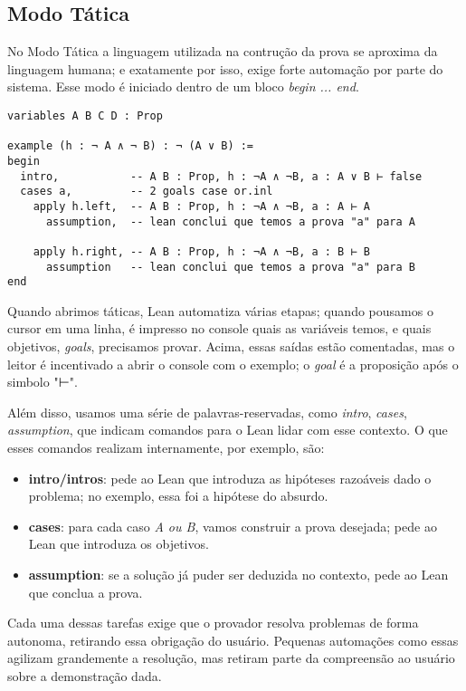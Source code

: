 \subsection{Modo Tática}
No Modo Tática a linguagem utilizada na contrução da prova se aproxima da linguagem humana; e exatamente por isso, exige forte automação por parte do sistema. Esse modo é iniciado dentro de um bloco \textit{begin ... end}.

\vspace{5mm}
\begin{lstlisting}
variables A B C D : Prop

example (h : ¬ A ∧ ¬ B) : ¬ (A ∨ B) :=
begin
  intro,           -- A B : Prop, h : ¬A ∧ ¬B, a : A ∨ B ⊢ false
  cases a,         -- 2 goals case or.inl
    apply h.left,  -- A B : Prop, h : ¬A ∧ ¬B, a : A ⊢ A
      assumption,  -- lean conclui que temos a prova "a" para A

    apply h.right, -- A B : Prop, h : ¬A ∧ ¬B, a : B ⊢ B
      assumption   -- lean conclui que temos a prova "a" para B
end
\end{lstlisting}
\vspace{5mm}

Quando abrimos táticas, Lean automatiza várias etapas; quando pousamos o cursor em uma linha, é impresso no console quais as variáveis temos, e quais objetivos, \textit{goals}, precisamos provar. Acima, essas saídas estão comentadas, mas o leitor é incentivado a abrir o console com o exemplo; o \textit{goal} é a proposição após o simbolo "⊢".

Além disso, usamos uma série de palavras-reservadas, como \textit{intro}, \textit{cases}, \textit{assumption}, que indicam comandos para o Lean lidar com esse contexto. O que esses comandos realizam internamente, por exemplo, são:

\begin{itemize}
    \item \textbf{intro/intros}: pede ao Lean que introduza as hipóteses razoáveis dado o problema; no exemplo, essa foi a hipótese do absurdo.
    \item \textbf{cases}: para cada caso \textit{A ou B}, vamos construir a prova desejada; pede ao Lean que introduza os objetivos.
    \item \textbf{assumption}: se a solução já puder ser deduzida no contexto, pede ao Lean que conclua a prova.
\end{itemize}

\noindent Cada uma dessas tarefas exige que o provador resolva problemas de forma autonoma, retirando essa obrigação do usuário. Pequenas automações como essas agilizam grandemente a resolução, mas retiram parte da compreensão ao usuário sobre a demonstração dada.

